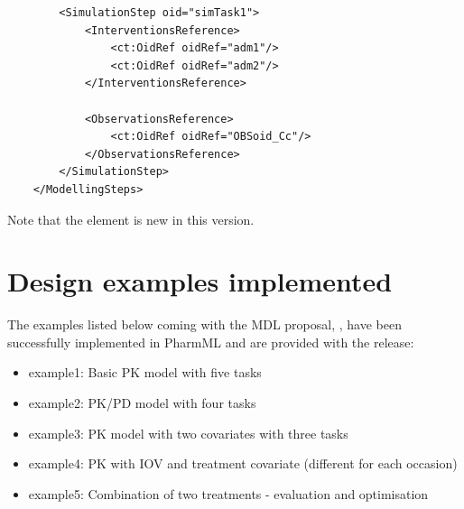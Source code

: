 \begin{example}
\begin{lstlisting}
        <SimulationStep oid="simTask1">
            <InterventionsReference>
                <ct:OidRef oidRef="adm1"/>
                <ct:OidRef oidRef="adm2"/>
            </InterventionsReference>
            
            <ObservationsReference>
                <ct:OidRef oidRef="OBSoid_Cc"/>
            </ObservationsReference>
        </SimulationStep>
    </ModellingSteps>
\end{lstlisting}
Note that the  element is new in this version.
\end{example}

\section{Design examples implemented}
The examples listed below coming with the MDL proposal, \cite{CommetsExamples2015},
have been successfully implemented in PharmML and are provided with the release:

\begin{itemize}
\item 
example1: Basic PK model with five tasks
\item 
example2: PK/PD model with four tasks
\item 
example3: PK model with two covariates with three tasks
\item 
example4: PK with IOV and treatment covariate (different for each occasion)
\item 
example5: Combination of two treatments - evaluation and optimisation
\end{itemize}




